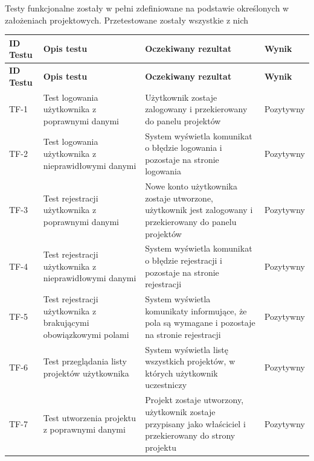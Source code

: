 Testy funkcjonalne zostały w pełni zdefiniowane na podstawie określonych w założeniach projektowych. Przetestowane zostały wszystkie z nich

\begin{longtable}{|p{2cm}|p{6cm}|p{5cm}|p{2.5cm}|}

\hline

\textbf{ID Testu} & \textbf{Opis testu} & \textbf{Oczekiwany rezultat} & \textbf{Wynik} \\ \hline

\endfirsthead



\hline

\textbf{ID Testu} & \textbf{Opis testu} & \textbf{Oczekiwany rezultat} & \textbf{Wynik} \\ \hline

\endhead

TF-1 & Test logowania użytkownika z poprawnymi danymi & Użytkownik zostaje zalogowany i przekierowany do panelu projektów & Pozytywny \\ \hline

TF-2 & Test logowania użytkownika z nieprawidłowymi danymi & System wyświetla komunikat o błędzie logowania i pozostaje na stronie logowania & Pozytywny \\ \hline

TF-3 & Test rejestracji użytkownika z poprawnymi danymi & Nowe konto użytkownika zostaje utworzone, użytkownik jest zalogowany i przekierowany do panelu projektów & Pozytywny \\ \hline

TF-4 & Test rejestracji użytkownika z nieprawidłowymi danymi & System wyświetla komunikat o błędzie rejestracji i pozostaje na stronie rejestracji & Pozytywny \\ \hline

TF-5 & Test rejestracji użytkownika z brakującymi obowiązkowymi polami & System wyświetla komunikaty informujące, że pola są wymagane i pozostaje na stronie rejestracji & Pozytywny \\ \hline

TF-6 & Test przeglądania listy projektów użytkownika & System wyświetla listę wszystkich projektów, w których użytkownik uczestniczy & Pozytywny \\ \hline

TF-7 & Test utworzenia projektu z poprawnymi danymi & Projekt zostaje utworzony, użytkownik zostaje przypisany jako właściciel i przekierowany do strony projektu & Pozytywny \\ \hline


\end{longtable}

